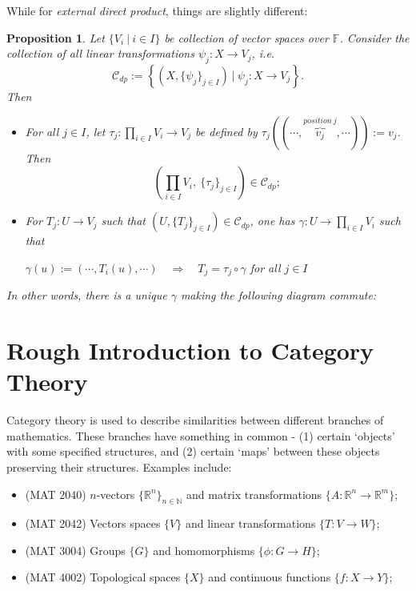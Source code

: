 \documentclass[12pt]{amsbook}
\newtheorem{proposition}[theorem]{Proposition}
\begin{document}
While for {\it external direct product}, things are slightly different:
\begin{proposition}
    Let $\{V_i\ |\ i \in I\}$ be collection of vector spaces over $\mathbb{F}$. Consider the collection of all linear transformations $\psi_j: X \to V_j$, i.e.
    $$\mathcal{C}_{dp} := \left\{(X, \{\psi_j\}_{j \in I})\ |\ \psi_j : X \to V_j \right\}.$$
    Then
    \begin{itemize}
        \item[(a)] For all $j \in I$, let $\tau_j: \prod_{i \in I} V_i \to V_j$ be defined by $\tau_j((\cdots, \overbrace{v_j}^{position\ j}, \cdots)) := v_j$. Then
        $$\left(\prod_{i \in I} V_i,\ \{\tau_j\}_{j \in I} \right) \in \mathcal{C}_{dp};$$
        \item[(b)] For $T_j: U \to V_j$ such that $(U, \{T_j\}_{j \in I}) \in \mathcal{C}_{dp}$, one has $\gamma: U \to \prod_{i \in I} V_i$  such that
        \begin{center}
        $\gamma(u) := (\cdots, T_i(u), \cdots) \quad \Rightarrow \quad T_j = \tau_j \circ \gamma$ for all $j \in I$
        \end{center}
    \end{itemize}
In other words, there is a unique $\gamma$ making the following diagram commute:
\begin{center}
\end{center}
\end{proposition}

\section{Rough Introduction to Category Theory} \label{sec-univ}
Category theory is used to describe similarities between different branches of mathematics. These branches have something in common - (1) certain `objects' with some specified structures, and (2) certain `maps' between these objects preserving their structures. Examples include:
\begin{itemize}
    \item(MAT 2040) $n$-vectors $\{\mathbb{R}^n\}_{n \in \mathbb{N}}$ and matrix transformations $\{A: \mathbb{R}^n \to \mathbb{R}^m\}$;
    \item(MAT 2042) Vectors spaces $\{V\}$ and linear transformations $\{T: V \to W\}$;
    \item(MAT 3004) Groups $\{G\}$ and homomorphisms $\{\phi: G \to H\}$;
    \item(MAT 4002) Topological spaces $\{X\}$ and continuous functions $\{f: X \to Y\}$;
\end{itemize}
\end{document}

